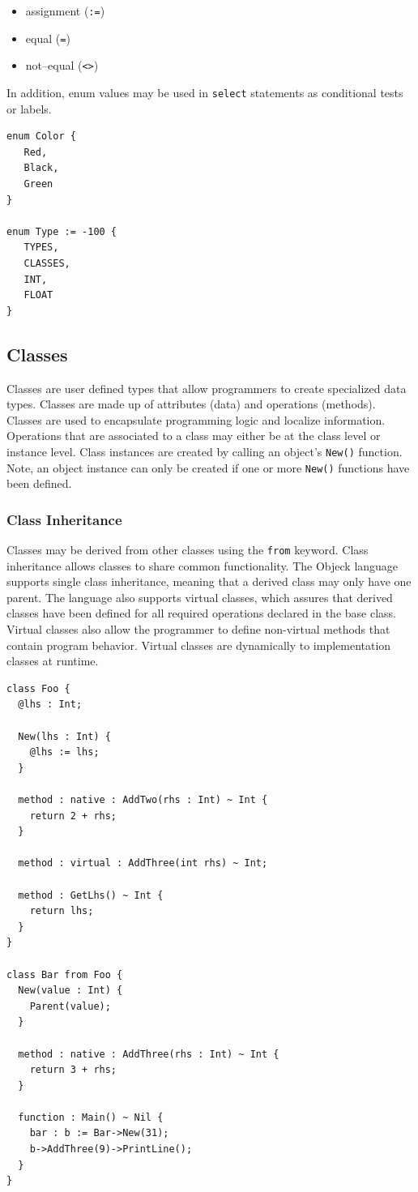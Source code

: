 \documentclass[11pt]{article}
\begin{document}
\begin{itemize}
\item assignment (\texttt{:=})
\item equal (\texttt{=})
\item not--equal (\texttt{<>})
\end{itemize}

In addition, enum values may be used in \texttt{select} statements as
conditional tests or labels.

\begin{verbatim}
enum Color {
   Red,
   Black,
   Green
}

enum Type := -100 {
   TYPES,
   CLASSES,
   INT,
   FLOAT
}
\end{verbatim}

\subsection{Classes}
Classes are user defined types that allow programmers to create
specialized data types.  Classes are made up of attributes (data) and
operations (methods).  Classes are used to encapsulate programming
logic and localize information.  Operations that are associated to a
class may either be at the class level or instance level.  Class
instances are created by calling an object's \texttt{New()} function.
Note, an object instance can only be created if one or more
\texttt{New()} functions have been defined.

\subsubsection{Class Inheritance}
Classes may be derived from other classes using the \texttt{from}
keyword.  Class inheritance allows classes to share common
functionality.  The Objeck language supports single class inheritance,
meaning that a derived class may only have one parent.  The language
also supports virtual classes, which assures that derived classes have
been defined for all required operations declared in the base class.
Virtual classes also allow the programmer to define non-virtual
methods that contain program behavior.  Virtual classes are
dynamically 
 to implementation classes at runtime.
\begin{verbatim}
class Foo {
  @lhs : Int;

  New(lhs : Int) {
    @lhs := lhs;
  }

  method : native : AddTwo(rhs : Int) ~ Int {
    return 2 + rhs;
  }

  method : virtual : AddThree(int rhs) ~ Int;

  method : GetLhs() ~ Int {
    return lhs;
  }
}

class Bar from Foo {
  New(value : Int) {
    Parent(value);
  }

  method : native : AddThree(rhs : Int) ~ Int {
    return 3 + rhs;
  }

  function : Main() ~ Nil {
    bar : b := Bar->New(31);
    b->AddThree(9)->PrintLine();
  }
}
\end{verbatim}
\end{document}
